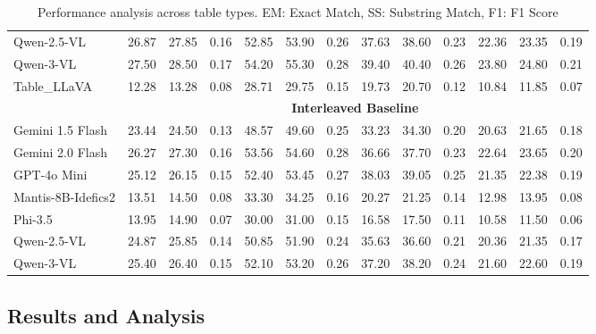 \documentclass[11pt]{article}
\begin{document}
\begin{table}[t]
\begin{tabular}{lccc|ccc|ccc|ccc}
 Qwen-2.5-VL          & 26.87 & 27.85 & 0.16 & 52.85 & 53.90 & 0.26 & 37.63 & 38.60 & 0.23 & 22.36 & 23.35 & 0.19 \\
 Qwen-3-VL            & 27.50 & 28.50 & 0.17 & 54.20 & 55.30 & 0.28 & 39.40 & 40.40 & 0.26 & 23.80 & 24.80 & 0.21 \\
 Table\_LLaVA         & 12.28 & 13.28 & 0.08 & 28.71 & 29.75 & 0.15 & 19.73 & 20.70 & 0.12 & 10.84 & 11.85 & 0.07 \\
\cmidrule{2-13}
& \multicolumn{12}{c}{\textbf{Interleaved Baseline}} \\
\cmidrule{2-13}
 Gemini 1.5 Flash     & 23.44 & 24.50 & 0.13 & 48.57 & 49.60 & 0.25 & 33.23 & 34.30 & 0.20 & 20.63 & 21.65 & 0.18 \\
 Gemini 2.0 Flash     & \cellcolor{yellow}26.27 & \cellcolor{yellow}27.30 & \cellcolor{yellow}0.16 & \cellcolor{yellow}53.56 & \cellcolor{yellow}54.60 & \cellcolor{yellow}0.28 & 36.66 & 37.70 & 0.23 & \cellcolor{yellow}22.64 & \cellcolor{yellow}23.65 & \cellcolor{yellow}0.20 \\
 GPT-4o Mini          & 25.12 & 26.15 & 0.15 & 52.40 & 53.45 & 0.27 & \cellcolor{yellow}38.03 & \cellcolor{yellow}39.05 & \cellcolor{yellow}0.25 & 21.35 & 22.38 & 0.19 \\
 Mantis-8B-Idefics2   & 13.51 & 14.50 & 0.08 & 33.30 & 34.25 & 0.16 & 20.27 & 21.25 & 0.14 & 12.98 & 13.95 & 0.08 \\
 Phi-3.5              & 13.95 & 14.90 & 0.07 & 30.00 & 31.00 & 0.15 & 16.58 & 17.50 & 0.11 & 10.58 & 11.50 & 0.06 \\
 Qwen-2.5-VL          & 24.87 & 25.85 & 0.14 & 50.85 & 51.90 & 0.24 & 35.63 & 36.60 & 0.21 & 20.36 & 21.35 & 0.17 \\
 Qwen-3-VL            & 25.40 & 26.40 & 0.15 & 52.10 & 53.20 & 0.26 & 37.20 & 38.20 & 0.24 & 21.60 & 22.60 & 0.19 \\
\bottomrule
\end{tabular}
\vspace{-0.5em}
\caption{\small Performance analysis across table types. EM: Exact Match, SS: Substring Match, F1: F1 Score}
\label{tab:table_types}
\vspace{-1em}
\end{table}



\subsection{Results and Analysis}
\end{document}
